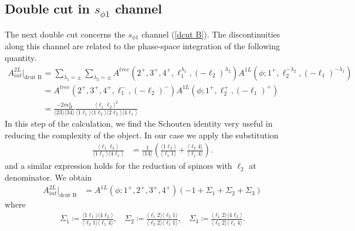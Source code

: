 \subsection{Double cut in $s_{\phi1}$ channel}	\label{sec:dcutB}
The next double cut concerns the $s_{\phi1}$ channel (\ref{dcut B}).
The discontinuities along this channel are related to the phase-space integration of the following quantity.
\begin{align*}
	A^{2L}_{int}|_{\text{dcut B}}&=\sum_{\lambda_1=\pm}\sum_{\lambda_2=\pm}A^{tree}(2^+,3^+,4^+,\ell_1^{\lambda_1},(-\ell_2)^{\lambda_2})A^{1L}(\phi;1^+,\ell_2^{-\lambda_2},(-\ell_1)^{-\lambda_1})\\
	&=A^{tree}(2^+,3^+,4^+,\ell_1^{-},(-\ell_2)^{-})A^{1L}(\phi;1^+,\ell_2^{+},(-\ell_1)^{+})\\
	&=\frac{-2m_H^4}{\langle 23 \rangle\langle 34 \rangle}\frac{\langle \ell_1\ell_2 \rangle^2}{\langle 1 \ell_1 \rangle \langle 1 \ell_2 \rangle \langle 2 \ell_2 \rangle\langle 4 \ell_1 \rangle}
\end{align*}
In this step of the calculation, we find the Schouten identity very useful in reducing the complexity of the object.
In our case we apply the substitution
\begin{align*}
	\frac{\langle\ell_1 \ell_2 \rangle}{\langle 1\ell_1 \rangle \langle 4\ell_1 \rangle}&=\frac{1}{\langle 14 \rangle}\left(\frac{\langle 1 \ell_2 \rangle}{\langle \ell_1 1\rangle}+\frac{\langle \ell_2 4 \rangle}{\langle \ell_1 4 \rangle}\right).
\end{align*}
and a similar expression holds for the reduction of spinors with $\ell_2$ at denominator. We obtain
\begin{align*}
	A^{2L}_{int}|_{\text{dcut B}}&=A^{1L}(\phi;1^+,2^+,3^+,4^+)(-1+\Sigma_1+\Sigma_2+\Sigma_3)
\end{align*}
where
\begin{align*}
	\Sigma_1\coloneqq\frac{\langle 1 \ell_1 \rangle \langle 4\ell_2 \rangle}{\langle \ell_2 1 \rangle \langle \ell_1 4 \rangle},\ \ \ \ \Sigma_2\coloneqq\frac{\langle \ell_1 2 \rangle \langle \ell_2 1 \rangle}{\langle \ell_2 2 \rangle \langle \ell_1 1 \rangle},\ \ \ \ \Sigma_3\coloneqq\frac{\langle \ell_1 2 \rangle \langle 4 \ell_2 \rangle}{\langle \ell_2 2 \rangle\langle \ell_1 4 \rangle}.
\end{align*}

